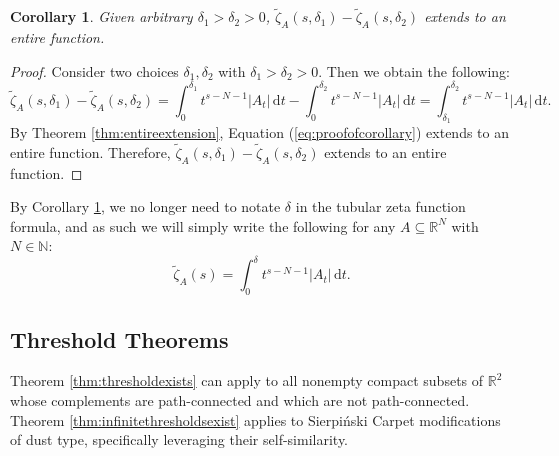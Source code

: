 \documentclass{article}
\theoremstyle{plain}
\newtheorem{corollary}{Corollary}
\numberwithin{equation}{section}
\numberwithin{table}{section}
\numberwithin{figure}{section}
\newcommand{\vaddspace}[1]{\rule{0pt}{#1pt}}
\newcommand{\newparagraph}{\vaddspace{10}}
\begin{document}
\begin{corollary} \label{thm:anydelta}
Given arbitrary $\delta_1 > \delta_2 > 0$, $\tilde{\zeta}_A(s,\delta_1) - \tilde{\zeta}_A(s,\delta_2)$ extends to an entire function.
\end{corollary}

\begin{proof}
Consider two choices $\delta_1,\delta_2$ with $\delta_1 > \delta_2 > 0$. Then we obtain the following:
\begin{equation}
\tilde{\zeta}_A(s,\delta_1) - \tilde{\zeta}_A(s,\delta_2)
= \int_0^{\delta_1} t^{s-N-1} |A_t| \,\mathrm{d}t - \int_0^{\delta_2} t^{s-N-1} |A_t| \,\mathrm{d}t
= \int_{\delta_1}^{\delta_2} t^{s-N-1} |A_t| \,\mathrm{d}t. \label{eq:proofofcorollary}
\end{equation}
By Theorem \ref{thm:entireextension}, Equation (\ref{eq:proofofcorollary}) extends to an entire function. Therefore, $\tilde{\zeta}_A(s,\delta_1) - \tilde{\zeta}_A(s,\delta_2)$ extends to an entire function.
\end{proof}

By Corollary \ref{thm:anydelta}, we no longer need to notate $\delta$ in the tubular zeta function formula, and as such we will simply write the following for any $A \subseteq \mathbb{R}^N$ with $N \in \mathbb{N}$:
\begin{equation}
\tilde{\zeta}_A(s) = \int_0^{\delta} t^{s-N-1} |A_t| \,\mathrm{d}t.
\end{equation}
\newparagraph



\subsection{Threshold Theorems} \label{chap:thresholdtheorem}
Theorem \ref{thm:thresholdexists} can apply to all nonempty compact subsets of $\mathbb{R}^2$ whose complements are path-connected and which are not path-connected. Theorem \ref{thm:infinitethresholdsexist} applies to Sierpi\'nski Carpet modifications of dust type, specifically leveraging their self-similarity.

\end{document}
